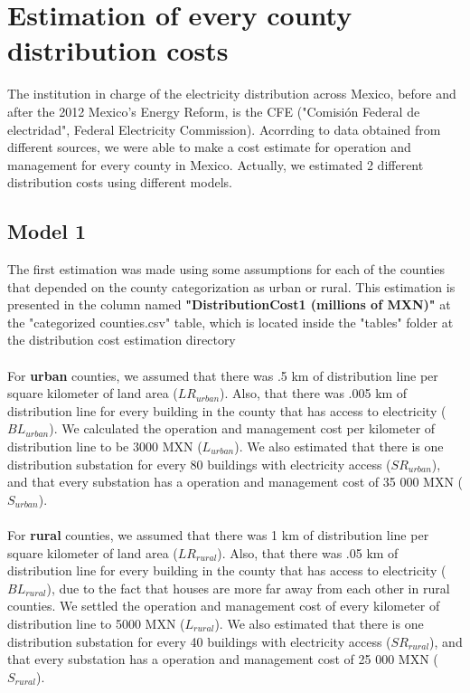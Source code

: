 \documentclass[•]{article}
\begin{document}
\section{Estimation of every county distribution costs}
The institution in charge of the electricity distribution across Mexico, before and after the 2012 Mexico's Energy Reform, is the CFE ("Comisión Federal de electridad", Federal Electricity Commission). Acorrding to data obtained from different sources, we were able to make a cost estimate for operation and management for every county in Mexico. Actually, we estimated 2 different distribution costs using different models.
\subsection{Model 1}
The first estimation was made using some assumptions for each of the counties that depended on the county categorization as urban or rural. This estimation is presented in the column named \textbf{"DistributionCost1 (millions of MXN)"} at the "categorized counties.csv" table, which is located inside the "tables" folder at the distribution cost estimation directory
\\
\\For \textbf{urban} counties, we assumed that there was .5 km of distribution line per square kilometer of land area ($LR_{urban}$). Also, that there was .005 km of distribution line for every building in the county that has access to electricity ($BL_{urban}$). We calculated the operation and management cost per kilometer of distribution line to be 3000 MXN ($L_{urban}$). We also estimated that there is one distribution substation for every 80 buildings with electricity access ($SR_{urban}$), and that every substation has a operation and management cost of 35 000 MXN ($S_{urban}$).
\\
\\For \textbf{rural} counties, we assumed that there was 1 km of distribution line per square kilometer of land area ($LR_{rural}$). Also, that there was .05 km of distribution line for every building in the county that has access to electricity ($BL_{rural}$), due to the fact that houses are more far away from each other in rural counties. We settled the operation and management cost of every kilometer of distribution line to 5000 MXN ($L_{rural}$). We also estimated that there is one distribution substation for every  40 buildings with electricity access ($SR_{rural}$), and that every substation has a operation and management cost of 25 000 MXN ($S_{rural}$).
\end{document}
